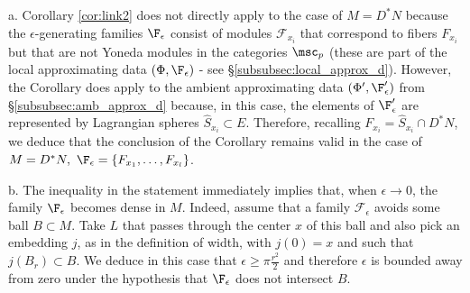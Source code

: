 \begin{rem}\label{rem:width-fibers}
a. Corollary \ref{cor:link2} does not directly apply to the case of $M=D^{\ast}N$ because the $\epsilon$-generating 
families $\F_{\epsilon}$ consist  of modules $\mathscr{F}_{x_{i}}$ that correspond to fibers $F_{x_{i}}$ 
but that are not Yoneda modules in the categories $\msc_{p}$ (these are part of the local approximating 
data $(\Phi, \F_{\epsilon})$ - see \S\ref{subsubsec:local_approx_d}).
However, the Corollary does apply to the ambient approximating data $(\Phi',\F'_{\epsilon})$ from \S\ref{subsubsec:amb_approx_d} because, in this case, the elements of $\F'_{\epsilon}$ are represented
by Lagrangian spheres $\hat{S}_{x_{i}}\subset E$. Therefore, recalling $F_{x_{i}}=\hat{S}_{x_{i}}\cap D^{\ast}N$, we deduce that the conclusion of the Corollary remains valid in the case of $M=D^{\ast}N, \ \F_{\epsilon}=\{ F_{x_{1}},\ldots, F_{x_{l}}\}$.


b. The inequality in the statement immediately implies that, when $\epsilon\to 0$, the family $\F_{\epsilon}$ becomes dense in $M$. Indeed, assume that a family $\mathcal{F}_{\epsilon}$ avoids some  ball 
$B\subset M$. Take $L$ that passes through the center $x$ of this ball and also pick an embedding 
$j$, as in the definition of width, with $j(0)=x$ and such that $j(B_{r})\subset B$. We deduce in this case that 
$\epsilon \geq \pi\frac{{r}^{2}}{2}$ and therefore $\epsilon$ is bounded away from zero under the hypothesis
that $\F_{\epsilon}$ does not intersect $B$.


\end{rem}
